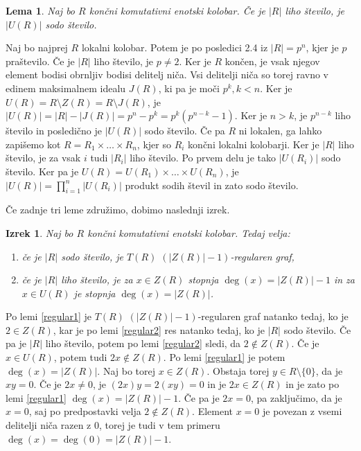 \documentclass[a4paper, 12pt]{amsart}
\theoremstyle{definition} %
\theoremstyle{plain} %
\newtheorem{lema}[definicija]{Lema}
\newtheorem{izrek}[definicija]{Izrek}
\begin{document}
\begin{lema}
\label{regular3}
Naj bo $R$ končni komutativni enotski kolobar. Če je $|R|$ liho število, je $|U(R)|$ sodo število.
\end{lema}

\proof
Naj bo najprej $R$ lokalni kolobar. Potem je po posledici 2.4 iz \cite{diploma} $|R| = p^n$, kjer je $p$ praštevilo. Če je $|R|$ liho število, je $p\neq 2$. Ker je $R$ končen, je vsak njegov element bodisi obrnljiv bodisi delitelj niča. Vsi delitelji niča so torej ravno v edinem maksimalnem idealu $J(R)$, ki pa je moči $p^k, k < n$. Ker je $U(R) = R \setminus Z(R) = R \setminus J(R)$, je $|U(R)| = |R| - |J(R) | = p^n - p ^k = p^k(p^{n-k} -1)$. Ker je $n>k$, je $p^{n-k}$ liho število in posledično je $|U(R)|$ sodo število. Če pa $R$ ni lokalen, ga lahko zapišemo kot $R= R_1 \times \dots \times R_n$, kjer so $R_i$ končni lokalni kolobarji. Ker je $|R|$ liho število, je za vsak $i$ tudi $|R_i|$ liho število. Po prvem delu je tako $|U(R_i)| $ sodo število. Ker pa je $U(R) = U(R_1) \times \dots \times U(R_n)$, je $|U(R)| = \prod_{i=1}^n |U(R_i)|$ produkt sodih števil in zato sodo število.
\endproof

Če zadnje tri leme združimo, dobimo naslednji izrek.

\begin{izrek}
\label{regularnostT(R)}
Naj bo $R$ končni komutativni enotski  kolobar. Tedaj velja:
 \begin{enumerate}
\item če je $|R|$ sodo število, je $T(R)$ $(|Z(R)| -1)$-regularen graf,
\item če je $|R|$ liho število, je za $x\in Z(R)$ stopnja $\deg(x) = |Z(R)| - 1$ in za $x\in U(R)$ je stopnja $\deg(x) = |Z(R)|$.
\end{enumerate}
\end{izrek}

\proof
Po lemi \ref{regular1} je $T(R)$ $(|Z(R)| -1)$-regularen graf natanko tedaj, ko je $2\in Z(R)$, kar je po lemi \ref{regular2}  res natanko tedaj, ko je $|R|$ sodo število. Če pa je $|R|$ liho število, potem po lemi \ref{regular2} sledi, da $2\notin Z(R)$. Če je $x \in U(R)$, potem tudi $2x\notin Z(R)$. Po lemi \ref{regular1} je potem $\deg(x) = |Z(R)|$. Naj bo torej $x\in Z(R)$. Obstaja torej $y\in R \setminus \{0\}$, da je $xy=0$. Če je $2x \neq 0$, je $(2x) y = 2(xy) = 0$ in je $2x\in Z(R)$ in je zato po lemi \ref{regular1} $\deg(x) = |Z(R)|-1$. Če pa je $2x = 0$, pa zaključimo, da je $x=0$, saj po predpostavki velja $2\notin Z(R)$. Element $x=0$ je povezan z vsemi delitelji niča razen z 0, torej je tudi v tem primeru $\deg(x) = \deg(0) = |Z(R)| - 1$.
\endproof
\end{document}

